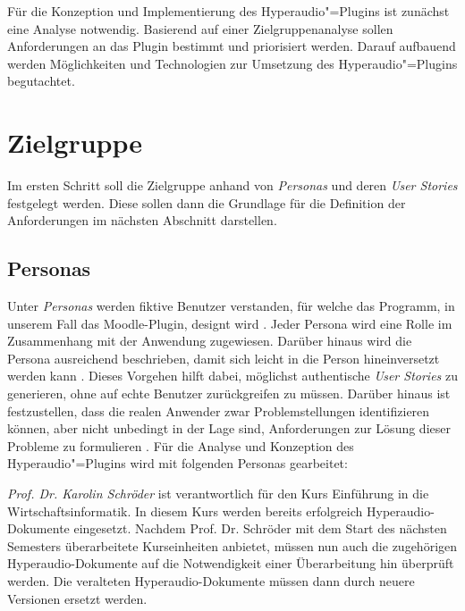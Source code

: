 \label{cha:analyse}
Für die Konzeption und Implementierung des Hyperaudio"=Plugins ist zunächst eine Analyse notwendig. Basierend auf einer Zielgruppenanalyse sollen Anforderungen an das Plugin bestimmt und priorisiert werden. Darauf aufbauend werden Möglichkeiten und Technologien zur Umsetzung des Hyperaudio"=Plugins begutachtet.



\section{Zielgruppe}
Im ersten Schritt soll die Zielgruppe anhand von \textit{Personas} und deren \textit{User Stories} festgelegt werden. Diese sollen dann die Grundlage für die Definition der Anforderungen im nächsten Abschnitt darstellen.


\subsection{Personas}
\label{sec:personas}
Unter \textit{Personas} werden fiktive Benutzer verstanden, für welche das Programm, in unserem Fall das Moodle-Plugin, designt wird \citep{cooper2004inmates}. Jeder Persona wird eine Rolle im Zusammenhang mit der Anwendung zugewiesen. Darüber hinaus wird die Persona ausreichend beschrieben, damit sich leicht in die Person hineinversetzt werden kann \citep{cohn2004user}. Dieses Vorgehen hilft dabei, möglichst authentische \textit{User Stories} zu generieren, ohne auf echte Benutzer zurückgreifen zu müssen. Darüber hinaus ist festzustellen, dass die realen Anwender zwar Problemstellungen identifizieren können, aber nicht unbedingt in der Lage sind, Anforderungen zur Lösung dieser Probleme zu formulieren \citep{cooper2004inmates}. Für die Analyse und Konzeption des Hyperaudio"=Plugins wird mit folgenden Personas gearbeitet:

\par
\begingroup
\leftskip=1cm
\rightskip=1.5cm
\noindent

{\Large\emph{Prof. Dr. Karolin Schröder}} ist verantwortlich für den Kurs \glqq Einführung in die Wirtschaftsinformatik\grqq{}. In diesem Kurs werden bereits erfolgreich Hyperaudio-Dokumente eingesetzt. Nachdem Prof. Dr. Schröder mit dem Start des nächsten Semesters überarbeitete Kurseinheiten anbietet, müssen nun auch die zugehörigen Hyperaudio-Dokumente auf die Notwendigkeit einer Überarbeitung hin überprüft werden. Die veralteten Hyperaudio-Dokumente müssen dann durch neuere Versionen ersetzt werden.
\vspace{.5cm}


